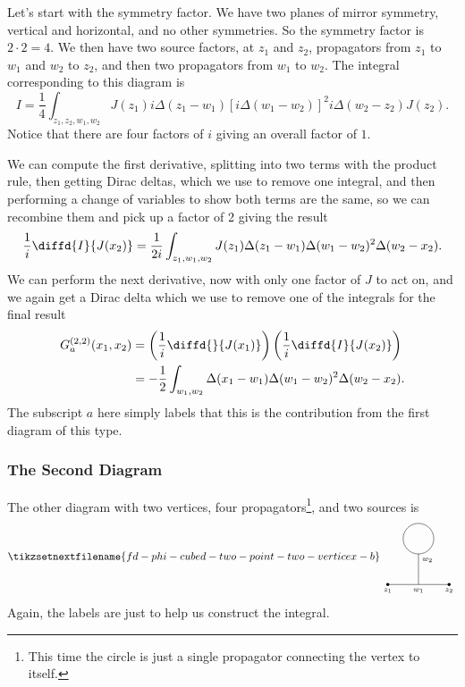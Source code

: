 \documentclass[fleqn]{NotesClass}
\begin{document}
    Let's start with the symmetry factor.
    We have two planes of mirror symmetry, vertical and horizontal, and no other symmetries.
    So the symmetry factor is \(2 \cdot 2 = 4\).
    We then have two source factors, at \(z_1\) and \(z_2\), propagators from \(z_1\) to \(w_1\) and \(w_2\) to \(z_2\), and then two propagators from \(w_1\) to \(w_2\).
    The integral corresponding to this diagram is
    \begin{equation}
        I = \frac{1}{4} \int_{z_1, z_2, w_1, w_2} J(z_1) i\Delta(z_1 - w_1)[i\Delta(w_1 - w_2)]^2 i\Delta(w_2 - z_2) J(z_2).
    \end{equation}
    Notice that there are four factors of \(i\) giving an overall factor of \(1\).
    
    We can compute the first derivative, splitting into two terms with the product rule, then getting Dirac deltas, which we use to remove one integral, and then performing a change of variables to show both terms are the same, so we can recombine them and pick up a factor of 2 giving the result
    \begin{equation}
        \frac{1}{i} \diffd{I}{J(x_2)} = \frac{1}{2i} \int_{z_1,w_1,w_2} J(z_1)\Delta(z_1 - w_1)\Delta(w_1 - w_2)^2\Delta(w_2 - x_2).
    \end{equation} 
    We can perform the next derivative, now with only one factor of \(J\) to act on, and we again get a Dirac delta which we use to remove one of the integrals for the final result
    \begin{align}
        G^{(2, 2)}_a(x_1, x_2) &= \left( \frac{1}{i} \diffd{}{J(x_1)} \right)\left( \frac{1}{i} \diffd{I}{J(x_2)} \right)\\
        &= -\frac{1}{2} \int_{w_1, w_2} \Delta(x_1 - w_1)\Delta(w_1 - w_2)^2\Delta(w_2 - x_2).
    \end{align}
    The subscript \(a\) here simply labels that this is the contribution from the first diagram of this type.
    
    \subsubsection{The Second Diagram}
    The other diagram with two vertices, four propagators\footnote{This time the circle is just a single propagator connecting the vertex to itself.}, and two sources is
    \begin{equation}
        \tikzsetnextfilename{fd-phi-cubed-two-point-two-verticex-b}
        \begin{tikzpicture}[baseline=(current bounding box)]
            \draw (-1, 0) node [below] {\scriptsize\(z_1\)} -- (1, 0) node [below] {\scriptsize\(z_2\)};
            \fill (-1, 0) circle [radius = 0.05];
            \fill (1, 0) circle [radius = 0.05];
            \draw (0, 0) node [below] {\scriptsize\(w_1\)} -- (0, 1) node [below right] {\scriptsize\(w_2\)};
            \draw (0, 1.5) circle [radius = 0.5];
        \end{tikzpicture}
    \end{equation}
    Again, the labels are just to help us construct the integral.
    
\end{document}

